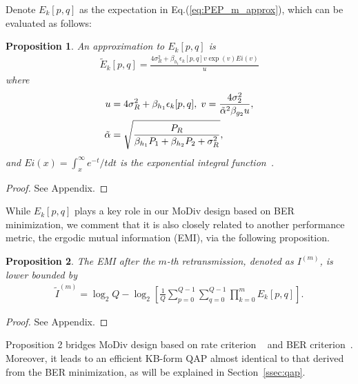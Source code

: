 \documentclass[journal]{IEEEtran}
\newtheorem{proposition}{Proposition}
\begin{document}
Denote $E_k[p,q]$ as the expectation in Eq.(\ref{eq:PEP_m_approx}), which can be
evaluated as follows:
\begin{proposition}
  An approximation to $E_k[p,q]$ is
  \begin{align}
    \tilde{E}_k[p,q] = \frac{4\sigma_R^2
    + \beta_{h_1}\epsilon_k[p,q]v\exp(v)Ei(v)}{u}
    \label{eq:E_k}
  \end{align}
  where
  \begin{subequations}
    \begin{align}
      u & = 4\sigma_R^2 + \beta_{h_1}\epsilon_k[p,q],\;
      v =
      \frac{4\sigma_2^2}{\tilde{\alpha}^2\beta_{g_2}u}, \notag\\
      \tilde{\alpha} & = \sqrt{\frac{P_R}{\beta_{h_1}P_1 +
      \beta_{h_2}P_2+\sigma_R^2}}, \notag
    \end{align}
  \end{subequations}
  and $Ei(x) = \int_x^\infty e^{-t}/tdt$ is the exponential integral
  function~\cite{zwillinger2014table}. 
  \label{prop:E_k}
\end{proposition}
\begin{proof}
  See Appendix.
\end{proof}
While $E_k[p,q]$ plays a key role in our MoDiv design based on BER minimization,
we comment that it is also closely related to another performance metric, the
ergodic mutual information (EMI), via the following proposition. 
\begin{proposition}
  The EMI after the $m$-th retransmission,
  denoted as $I^{(m)}$, is lower bounded by
  \begin{align}
    \tilde{I}^{(m)} = \log_2Q -
    \log_2\left[ \frac{1}{Q}　\sum_{p=0}^{Q-1}\sum_{q=0}^{Q-1}
    \prod_{k=0}^{m}E_k[p,q] \right].
  \end{align}
  \label{prop:EMI}
\end{proposition}
\begin{proof}
  See Appendix.
\end{proof}
Proposition 2 bridges MoDiv design based on rate criterion ~\cite{}
and BER criterion~\cite{}. Moreover, it leads to an efficient KB-form QAP almost
identical to that derived from the BER minimization, as will be explained in
Section~\ref{ssec:qap}.
\end{document}
